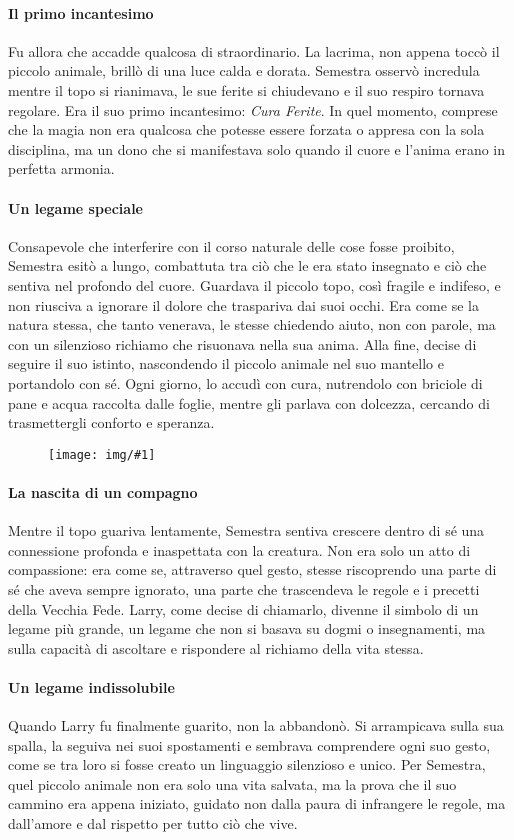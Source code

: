 \documentclass[letterpaper,twocolumn,openany,nodeprecatedcode]{dndbook}
\newcommand{\image}[3]{%
  \begin{figure}[#3]
    \begin{tcolorbox}[
        enhanced,
        colframe=PhbTan,
        colback=white,
        opacityback=0,
        title={\vspace{0.2cm}\centering \sc  \textbf{#2}\vspace{0.2cm}},
        colbacktitle=PhbTan!50!PhbLightCyan,
        coltitle=black,
        fonttitle=\bfseries
    ]
    \texttt{[image: img/\#1]}
    \end{tcolorbox}
  \end{figure}
}
\begin{document}
\paragraph{Il primo incantesimo}  
Fu allora che accadde qualcosa di straordinario. La lacrima, non appena toccò il piccolo animale, brillò di una luce calda e dorata. Semestra osservò incredula mentre il topo si rianimava, le sue ferite si chiudevano e il suo respiro tornava regolare. Era il suo primo incantesimo: \textit{Cura Ferite}. In quel momento, comprese che la magia non era qualcosa che potesse essere forzata o appresa con la sola disciplina, ma un dono che si manifestava solo quando il cuore e l’anima erano in perfetta armonia.

\paragraph{Un legame speciale}  
Consapevole che interferire con il corso naturale delle cose fosse proibito, Semestra esitò a lungo, combattuta tra ciò che le era stato insegnato e ciò che sentiva nel profondo del cuore. Guardava il piccolo topo, così fragile e indifeso, e non riusciva a ignorare il dolore che traspariva dai suoi occhi. Era come se la natura stessa, che tanto venerava, le stesse chiedendo aiuto, non con parole, ma con un silenzioso richiamo che risuonava nella sua anima. Alla fine, decise di seguire il suo istinto, nascondendo il piccolo animale nel suo mantello e portandolo con sé. Ogni giorno, lo accudì con cura, nutrendolo con briciole di pane e acqua raccolta dalle foglie, mentre gli parlava con dolcezza, cercando di trasmettergli conforto e speranza.
\image{semestra_larry-1.jpeg}{Semestra e Larry}{h!}
\paragraph{La nascita di un compagno}  
Mentre il topo guariva lentamente, Semestra sentiva crescere dentro di sé una connessione profonda e inaspettata con la creatura. Non era solo un atto di compassione: era come se, attraverso quel gesto, stesse riscoprendo una parte di sé che aveva sempre ignorato, una parte che trascendeva le regole e i precetti della Vecchia Fede. Larry, come decise di chiamarlo, divenne il simbolo di un legame più grande, un legame che non si basava su dogmi o insegnamenti, ma sulla capacità di ascoltare e rispondere al richiamo della vita stessa.

\paragraph{Un legame indissolubile}  
Quando Larry fu finalmente guarito, non la abbandonò. Si arrampicava sulla sua spalla, la seguiva nei suoi spostamenti e sembrava comprendere ogni suo gesto, come se tra loro si fosse creato un linguaggio silenzioso e unico. Per Semestra, quel piccolo animale non era solo una vita salvata, ma la prova che il suo cammino era appena iniziato, guidato non dalla paura di infrangere le regole, ma dall’amore e dal rispetto per tutto ciò che vive.
\end{document}
